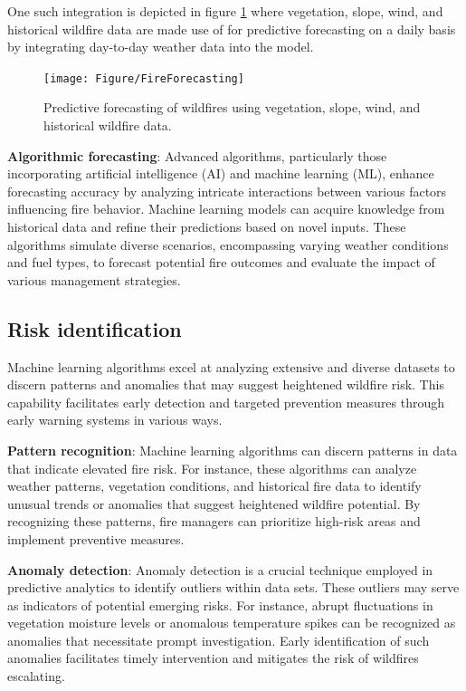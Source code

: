 \documentclass[
  12 pt,
]{Nemilov}
\begin{document}
One such integration is depicted in figure \ref{fig:FireForecasting} where vegetation, slope, wind, and historical wildfire data are made use of for predictive forecasting on a daily basis by integrating day-to-day weather data into the model.

\begin{figure}

{\centering \texttt{[image: Figure/FireForecasting]} 

}

\caption{Predictive forecasting of wildfires using vegetation, slope, wind, and historical wildfire data.}\label{fig:FireForecasting}
\end{figure}

\textbf{Algorithmic forecasting}: Advanced algorithms, particularly those incorporating artificial intelligence (AI) and machine learning (ML), enhance forecasting accuracy by analyzing intricate interactions between various factors influencing fire behavior. Machine learning models can acquire knowledge from historical data and refine their predictions based on novel inputs. These algorithms simulate diverse scenarios, encompassing varying weather conditions and fuel types, to forecast potential fire outcomes and evaluate the impact of various management strategies.

\subsection{Risk identification}\label{risk-identification}

Machine learning algorithms excel at analyzing extensive and diverse datasets to discern patterns and anomalies that may suggest heightened wildfire risk. This capability facilitates early detection and targeted prevention measures through early warning systems in various ways.

\textbf{Pattern recognition}: Machine learning algorithms can discern patterns in data that indicate elevated fire risk. For instance, these algorithms can analyze weather patterns, vegetation conditions, and historical fire data to identify unusual trends or anomalies that suggest heightened wildfire potential. By recognizing these patterns, fire managers can prioritize high-risk areas and implement preventive measures.

\textbf{Anomaly detection}: Anomaly detection is a crucial technique employed in predictive analytics to identify outliers within data sets. These outliers may serve as indicators of potential emerging risks. For instance, abrupt fluctuations in vegetation moisture levels or anomalous temperature spikes can be recognized as anomalies that necessitate prompt investigation. Early identification of such anomalies facilitates timely intervention and mitigates the risk of wildfires escalating.
\end{document}
